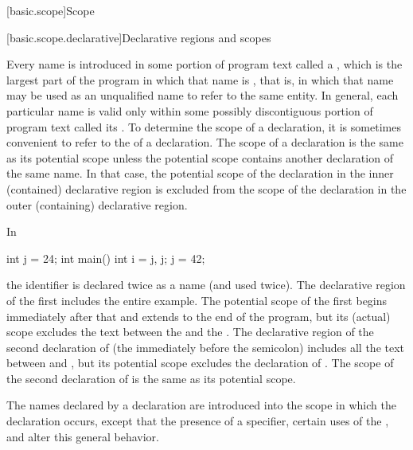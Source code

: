 [basic.scope]{Scope}%

[basic.scope.declarative]{Declarative regions and scopes}%

\pnum
{}%
Every name is introduced in some portion of program text called a
%
%
, which is the largest part of the program
in which that name is , that is, in which that name may
be used as an unqualified name to refer to the same entity. In general,
each particular name is valid only within some possibly discontiguous
portion of program text called its . To determine the
scope of a declaration, it is sometimes convenient to refer to the
 of a declaration. The scope of a declaration
is the same as its potential scope unless the potential scope contains
another declaration of the same name. In that case, the potential scope
of the declaration in the inner (contained) declarative region is
excluded from the scope of the declaration in the outer (containing)
declarative region.

\pnum
\begin{example}
In

\begin{codeblock}
int j = 24;
int main() {
  int i = j, j;
  j = 42;
}
\end{codeblock}

the identifier  is declared twice as a name (and used twice).
The declarative region of the first  includes the entire
example. The potential scope of the first  begins immediately
after that  and extends to the end of the program, but its
(actual) scope excludes the text between the \tcode{,} and the
\tcode{\}}. The declarative region of the second declaration of
 (the  immediately before the semicolon) includes all
the text between \tcode{\{} and \tcode{\}}, but its potential scope
excludes the declaration of . The scope of the second
declaration of  is the same as its potential scope.
\end{example}

\pnum
The names declared by a declaration are introduced into the scope in
which the declaration occurs, except that the presence of a
 specifier, certain uses of the
, and
 alter this general
behavior.

